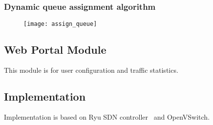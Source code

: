 \subsubsection{Dynamic queue assignment algorithm}

\begin{figure}[htb]
\centering
\texttt{[image: assign\_queue]}
\caption{}
\label{fig:assign_queue}
\end{figure}

\subsection{Web Portal Module}
This module is for user configuration and traffic statistics.


\subsection{Implementation}
Implementation is based on Ryu SDN controller~\cite{ryu} and OpenVSwitch.
